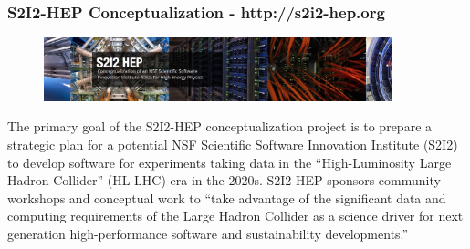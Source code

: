\begin{frame}
\frametitle{S2I2-HEP Conceptualization - http://s2i2-hep.org}

\begin{figure}[t]
\begin{center}
\includegraphics[width=0.9\textwidth]{images/s2i2-hep-website-banner.png}
\end{center}
\end{figure}

\small{The primary goal of the S2I2-HEP conceptualization project is to prepare a strategic plan for a potential NSF Scientific Software Innovation Institute (S2I2) to develop software for experiments taking data in the ``High-Luminosity Large Hadron Collider'' (HL-LHC) era in the 2020s.}
\vskip 0.1in
\small{S2I2-HEP sponsors community workshops and conceptual work to ``take advantage of the significant data and computing requirements of the Large Hadron Collider as a science driver for next generation high-performance software and sustainability developments.''}
\end{frame}


